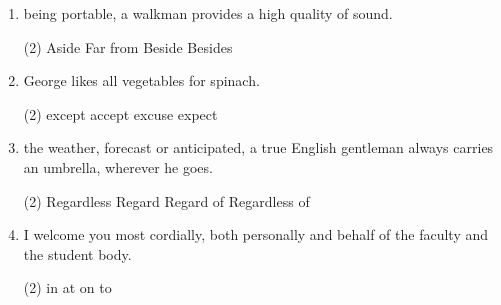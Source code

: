 \begin{enumerate}
\item \ttu being portable, a walkman provides a high quality of sound.
  \begin{tasks}(2)
    \task Aside
    \task Far from
    \task Beside
    \task Besides
  \end{tasks}

\item George likes all vegetables \ttu for spinach.
  \begin{tasks}(2)
    \task except
    \task accept
    \task excuse
    \task expect
  \end{tasks}

\item \ttu the weather, forecast or anticipated, a true English gentleman always carries an umbrella, wherever he goes.
  \begin{tasks}(2)
    \task Regardless
    \task Regard
    \task Regard of
    \task Regardless of
  \end{tasks}

\item I welcome you most cordially, both personally and \ttu behalf of the faculty and the student body.
  \begin{tasks}(2)
    \task in
    \task at
    \task on
    \task to
  \end{tasks}
\end{enumerate}

